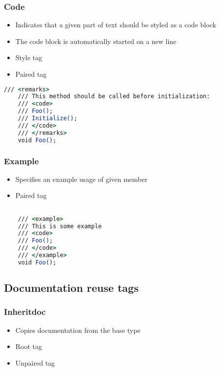 \subsubsection*{Code}
\begin{itemize}
    \item Indicates that a given part of text should be styled as a code block
    \item The code block is automatically started on a new line
    \item Style tag
    \item Paired tag
\end{itemize}

\begin{lstlisting}[language=csh]
    /// <remarks>
    /// This method should be called before initialization:
    /// <code>
    /// Foo();
    /// Initialize();
    /// </code>
    /// </remarks>
    void Foo();
\end{lstlisting}

\subsubsection*{Example}
\begin{itemize}
    \item Specifies an example usage of given member
    \item Paired tag
\end{itemize}

\begin{lstlisting}[language=csh]

    /// <example>
    /// This is some example
    /// <code>
    /// Foo();
    /// </code>
    /// </example>
    void Foo();

\end{lstlisting}

\subsection{Documentation reuse tags}

\subsubsection*{Inheritdoc} \label{sec:inheritdocTag}
\begin{itemize}
    \item Copies documentation from the base type
    \item Root tag
    \item Unpaired tag
\end{itemize}

